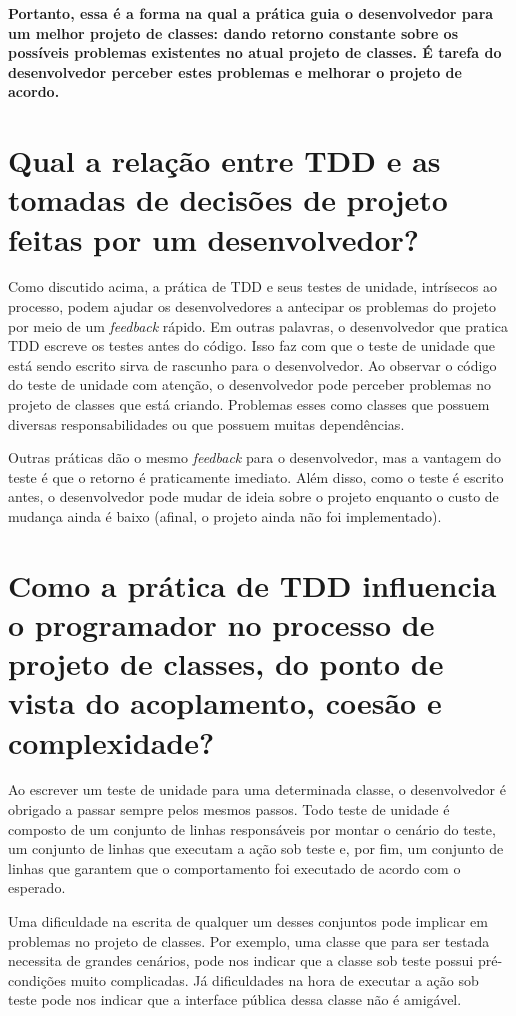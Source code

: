 \textbf{Portanto, essa é a forma na qual a prática guia o desenvolvedor para
um melhor projeto de classes: dando retorno constante sobre os possíveis problemas
existentes no atual projeto de classes. É tarefa do desenvolvedor perceber
estes problemas e melhorar o projeto de acordo.}

\section{Qual a relação entre TDD e as tomadas de decisões de projeto
feitas por um desenvolvedor?}

Como discutido acima, a prática de TDD e seus
testes de unidade, intrísecos ao processo, podem ajudar os desenvolvedores a antecipar
os problemas do projeto por meio de um \textit{feedback} rápido.
Em outras palavras, o desenvolvedor que pratica TDD escreve os testes antes do código.
Isso faz com que o teste de unidade que está sendo escrito sirva de
rascunho para o desenvolvedor. Ao observar o código do teste de unidade com atenção,
o desenvolvedor pode perceber problemas no projeto de classes que está criando.
Problemas esses como classes que possuem diversas responsabilidades
ou que possuem muitas dependências. 

Outras práticas dão o mesmo \textit{feedback}
para o desenvolvedor, mas a vantagem do teste é que o retorno é praticamente imediato.
Além disso, como o teste é escrito antes, o desenvolvedor pode mudar de ideia sobre
o projeto enquanto o custo de mudança ainda é baixo (afinal, o projeto ainda não
foi implementado).

\section{Como a prática de TDD influencia o programador no processo de  
projeto de classes, do ponto de vista do acoplamento, coesão e complexidade?}

Ao escrever um teste de unidade para uma determinada classe, o desenvolvedor
é obrigado a passar sempre pelos mesmos passos. Todo teste de unidade é composto
de um conjunto de linhas responsáveis por montar o cenário do teste, um conjunto
de linhas que executam a ação sob teste e, por fim, um conjunto de linhas que
garantem que o comportamento foi executado de acordo com o esperado.

Uma dificuldade na escrita de qualquer um desses conjuntos pode implicar
em problemas no projeto de classes. Por exemplo, uma classe que para
ser testada necessita de grandes cenários, pode nos indicar que a classe
sob teste possui pré-condições muito complicadas. Já dificuldades na hora
de executar a ação sob teste pode nos indicar que a interface pública dessa
classe não é amigável. 

